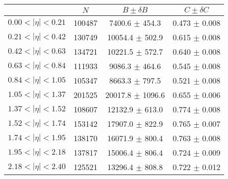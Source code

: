 \begin{tabular}{lccc}
\hline
    &   $N$   & $B \pm \delta B$  &  $C \pm \delta C$ \\
\hline
$0.00 < |\eta| <0.21$          & 100487     & 7400.6     $\pm$ 454.3 & 0.473      $\pm$ 0.008 \\
$0.21 < |\eta| <0.42$          & 130749     & 10054.4    $\pm$ 502.9 & 0.615      $\pm$ 0.008 \\
$0.42 < |\eta| <0.63$          & 134721     & 10221.5    $\pm$ 572.7 & 0.640      $\pm$ 0.008 \\
$0.63 < |\eta| <0.84$          & 111933     & 9086.3     $\pm$ 464.6 & 0.545      $\pm$ 0.008 \\
$0.84 < |\eta| <1.05$          & 105347     & 8663.3     $\pm$ 797.5 & 0.521      $\pm$ 0.008 \\
$1.05 < |\eta| <1.37$          & 201525     & 20017.8    $\pm$ 1096.6 & 0.655      $\pm$ 0.006 \\
$1.37 < |\eta| <1.52$          & 108607     & 12132.9    $\pm$ 613.0 & 0.774      $\pm$ 0.008 \\
$1.52 < |\eta| <1.74$          & 153142     & 17907.0    $\pm$ 822.9 & 0.765      $\pm$ 0.007 \\
$1.74 < |\eta| <1.95$          & 138170     & 16071.9    $\pm$ 800.4 & 0.763      $\pm$ 0.008 \\
$1.95 < |\eta| <2.18$          & 137817     & 15006.4    $\pm$ 806.4 & 0.724      $\pm$ 0.009 \\
$2.18 < |\eta| <2.40$          & 125521     & 13296.4    $\pm$ 808.8 & 0.722      $\pm$ 0.012 \\
\hline
\end{tabular}
